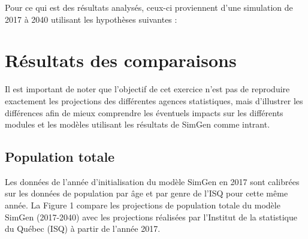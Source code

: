 \documentclass[letterpaper,10pt,french]{sphinxmanual}
\begin{document}
Pour ce qui est des résultats analysés, ceux-ci proviennent d’une simulation de 2017 à 2040 utilisant les hypothèses suivantes :

\begin{sphinxVerbatim}[commandchars=\\\{\}]
  
 
\end{sphinxVerbatim}


\section{Résultats des comparaisons}
\label{\detokenize{resultats:resultats-des-comparaisons}}
Il est important de noter que l’objectif de cet exercice n’est pas de reproduire exactement
les projections des différentes agences statistiques,
mais d’illustrer les différences afin de mieux comprendre les éventuels impacts
sur les différents modules et les modèles utilisant les résultats de SimGen comme intrant.


\subsection{Population totale}
\label{\detokenize{resultats:population-totale}}
\begin{figure}[htbp]
\centering

\noindent{}
\end{figure}

Les données de l’année d’initialisation du modèle SimGen en 2017 sont calibrées sur les données de population par âge et par genre de l’ISQ pour cette même année. La Figure 1 compare les projections de population totale du modèle SimGen (2017-2040) avec les projections réalisées par l’Institut de la statistique du Québec (ISQ) à partir de l’année 2017.
\end{document}
